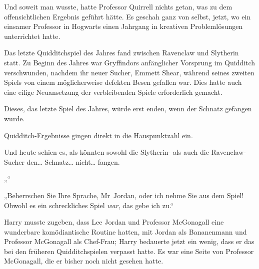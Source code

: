 Und soweit man wusste, hatte Professor Quirrell nichts getan, was zu dem offensichtlichen Ergebnis geführt hätte. Es geschah ganz von selbst, jetzt, wo ein einsamer Professor in Hogwarts einen Jahrgang in kreativen Problemlösungen unterrichtet hatte.

Das letzte Quidditchspiel des Jahres fand zwischen Ravenclaw und Slytherin statt. Zu Beginn des Jahres war Gryffindors anfänglicher Vorsprung im Quidditch verschwunden, nachdem ihr neuer Sucher, Emmett Shear, während seines zweiten Spiels von einem möglicherweise defekten Besen gefallen war. Dies hatte auch eine eilige Neuansetzung der verbleibenden Spiele erforderlich gemacht.

Dieses, das letzte Spiel des Jahres, würde erst enden, wenn der Schnatz gefangen wurde.

Quidditch-Ergebnisse gingen direkt in die Hauspunktzahl ein.

Und heute schien es, als könnten sowohl die Slytherin- als auch die Ravenclaw-Sucher den… Schnatz… nicht… fangen.

„“

„Beherrschen Sie Ihre Sprache, Mr~Jordan, oder ich nehme Sie aus dem Spiel! Obwohl es ein schreckliches Spiel \emph{war}, das gebe ich zu.“

Harry musste zugeben, dass Lee Jordan und Professor McGonagall eine wunderbare komödiantische Routine hatten, mit Jordan als Bananenmann und Professor McGonagall als Chef-Frau; Harry bedauerte jetzt ein wenig, dass er das bei den früheren Quidditchspielen verpasst hatte. Es war eine Seite von Professor McGonagall, die er bisher noch nicht gesehen hatte.

